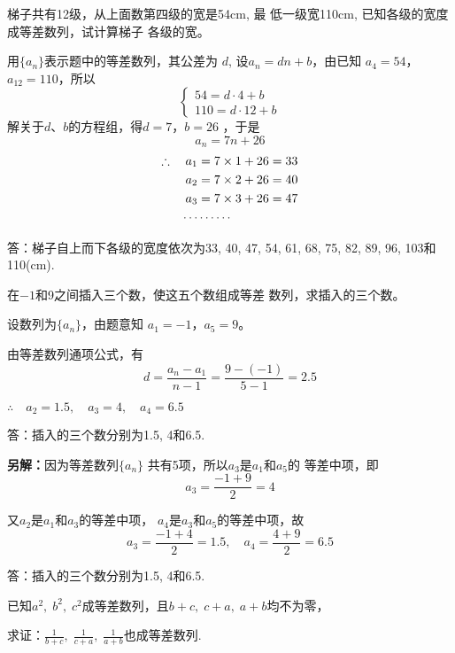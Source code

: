 \begin{example}
    梯子共有12级，从上面数第四级的宽是54cm, 最
低一级宽110cm, 已知各级的宽度成等差数列，试计算梯子
各级的宽。
\end{example}

\begin{solution}
    用$\{a_n\}$表示题中的等差数列，其公差为
$d$, 设$a_n=dn+b$，由已知
$a_4=54$，$a_{12}=110$，所以
\[\begin{cases}
    54=d\cdot 4+b\\
    110=d\cdot 12+b
\end{cases}\]
解关于$d$、$b$的方程组，得$d=7$，$b=26$
，于是
\[a_n=7n+26\]
\[\begin{split}
\therefore\quad a_1&=7\times 1+26=33\\
a_2&=7\times2+26=40\\
a_3&=7\times3+26=47\\
\cdots & \cdots\cdots
\end{split}\]

答：梯子自上而下各级的宽度依次为33, 40, 47, 54, 
61, 68, 75, 82, 89, 96, 103和110(cm).
\end{solution}

\begin{example}
    在$-1$和9之间插入三个数，使这五个数组成等差
数列，求插入的三个数。
\end{example}

\begin{solution}
    设数列为$\{a_n\}$，由题意知
$a_1=-1$，$a_5=9$。

由等差数列通项公式，有
\[d=\frac{a_n-a_1}{n-1}=\frac{9-(-1)}{5-1}=2.5\]

$\therefore\quad a_2=1.5,\quad a_3=4,\quad a_4=6.5$

答：插入的三个数分别为1.5, 4和6.5.

\textbf{另解：}因为等差数列$\{a_n\}$
共有5项，所以$a_3$是$a_1$和$a_5$的
等差中项，即
\[a_3=\frac{-1+9}{2}=4\]

又$a_2$是$a_1$和$a_3$的等差中项，
$a_4$是$a_3$和$a_5$的等差中项，故
\[a_3=\frac{-1+4}{2}=1.5,\quad a_4=\frac{4+9}{2}=6.5\]

答：插入的三个数分别为1.5, 4和6.5.
\end{solution}

\begin{example}
已知$a^2,\;b^2,\;c^2$成等差数列，且$b+c,\;c+a,\;a+b$均不为零，

求证：$\frac{1}{b+c},\;\frac{1}{c+a},\; \frac{1}{a+b}$也成等差数列.
\end{example}


